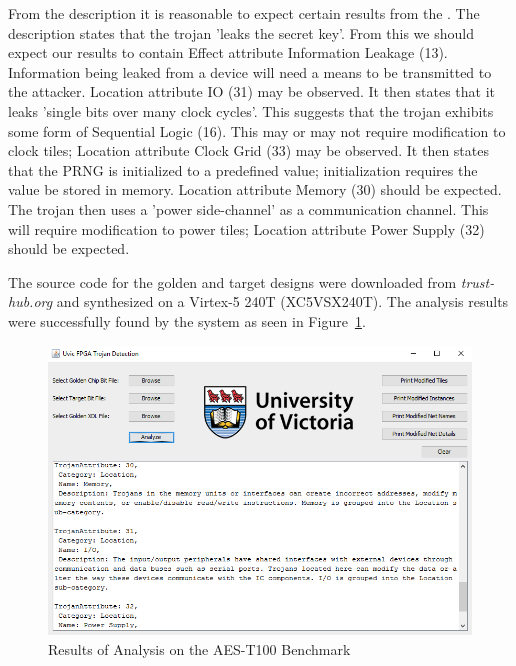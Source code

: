 From the description it is reasonable to expect certain results from the \Name.
The description states that the trojan 'leaks the secret key'.
From this we should expect our results to contain Effect attribute Information Leakage (13).
Information being leaked from a device will need a means to be transmitted to the attacker.
Location attribute \acrshort{IO} (31) may be observed.
It then states that it leaks 'single bits over many clock cycles'. 
This suggests that the trojan exhibits some form of Sequential Logic (16).
This may or may not require modification to clock tiles; Location attribute Clock Grid (33) may be observed. 
It then states that the PRNG is initialized to a predefined value; initialization requires the value be stored in memory. 
Location attribute Memory (30) should be expected.
The trojan then uses a 'power side-channel' as a communication channel.
This will require modification to power tiles; Location attribute Power Supply (32) should be expected.

The source code for the \gls{golden} and \gls{target} designs were downloaded from \textit{trust-hub.org} and synthesized on a Virtex-5 240T  (XC5VSX240T).
The analysis results were successfully found by the system as seen in Figure~\ref{fig:aesResult}.
\begin{figure}
\centering
\includegraphics[width=1\linewidth]{Figures/aesResult}
\caption[Results of Analysis on the AES-T100 Benchmark]{Results of Analysis on the AES-T100 Benchmark}
\label{fig:aesResult}
\end{figure}

